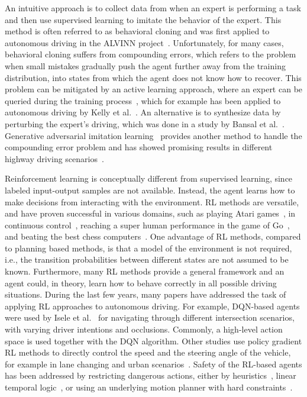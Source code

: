 An intuitive approach is to collect data from when an expert is performing a task and then use supervised learning to imitate the behavior of the expert. This method is often referred to as behavioral cloning and was first applied to autonomous driving in the ALVINN project~\cite{Pomerleau1989}. Unfortunately, for many cases, behavioral cloning suffers from compounding errors, which refers to the problem when small mistakes gradually push the agent further away from the training distribution, into states from which the agent does not know how to recover. This problem can be mitigated by an active learning approach, where an expert can be queried during the training process~\cite{Ross2011}, which for example has been applied to autonomous driving by Kelly et al.~\cite{Kelly2019}. An alternative is to synthesize data by perturbing the expert's driving, which was done in a study by Bansal et al.~\cite{Bansal2019}. Generative adversarial imitation learning~\cite{Ho2016} provides another method to handle the compounding error problem and has showed promising results in different highway driving scenarios~\cite{Kuefler2017}.

Reinforcement learning is conceptually different from supervised learning, since labeled input-output samples are not available. Instead, the agent learns how to make decisions from interacting with the environment.
RL methods are versatile, and have proven successful in various domains, such as playing Atari games~\cite{Mnih2015}, in continuous control~\cite{Lillicrap2015}, reaching a super human performance in the game of Go~\cite{Silver2017}, and beating the best chess computers~\cite{Silver2017chess}. One advantage of RL methods, compared to planning based methods, is that a model of the environment is not required, i.e., the transition probabilities between different states are not assumed to be known. Furthermore, many RL methods provide a general framework and an agent could, in theory, learn how to behave correctly in all possible driving situations.
%
During the last few years, many papers have addressed the task of applying RL approaches to autonomous driving. For example, DQN-based agents were used by Isele et al.~\cite{Isele2018} for navigating through different intersection scenarios, with varying driver intentions and occlusions. Commonly, a high-level action space is used together with the DQN algorithm. Other studies use policy gradient RL methods to directly control the speed and the steering angle of the vehicle, for example in lane changing and urban scenarios~\cite{Wang2019_ddpg, Chen2019}.
Safety of the RL-based agents has been addressed by restricting dangerous actions, either by heuristics~\cite{Mukadam2017}, linear temporal logic~\cite{Bouton2019}, or using an underlying motion planner with hard constraints~\cite{Shalev2016}.


